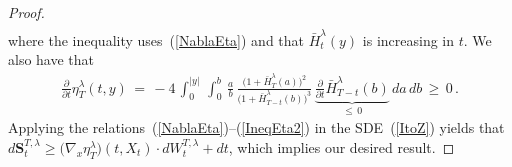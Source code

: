 \documentclass[10pt]{article}
\numberwithin{equation}{section}
\theoremstyle{definition}
\begin{document}
\begin{proof}
\begin{align}
\end{align}
where the inequality uses~(\ref{NablaEta}) and that $\bar{H}_{t}^{\lambda}(y)$ is increasing in $t$.  We also have that 
\begin{align}\label{IneqEta2}
    \frac{\partial}{\partial t}\eta_{T}^{\lambda} (t,y)\,=\,-4\,\int_0^{|y|} \, \int_0^b \,\frac{a}{b} \,\frac{\big( 1+\bar{H}_{T}^{\lambda}(a)\big)^2     }{\big( 1+\bar{H}_{T-t}^{\lambda}(b)\big)^3     }\,\underbrace{\frac{\partial}{\partial t}\bar{H}_{T-t}^{\lambda}(b)}_{\leq \, 0} \, da\, db \,\geq \,0\,.
\end{align}
Applying the relations~(\ref{NablaEta})--(\ref{IneqEta2}) in the SDE~(\ref{ItoZ}) yields that $  d\mathbf{S}_{t}^{T,\lambda}\geq \big(\nabla_x\eta_{T}^{\lambda}\big)(t,X_t) \cdot   dW^{T,\lambda}_t
 +dt $, which implies our desired result.
\end{proof}
\end{document}
